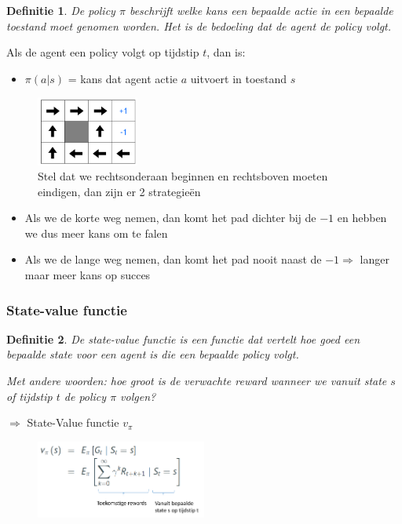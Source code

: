 \documentclass{article}
\newtheorem{theorem}{Definitie}[section]
\begin{document}
\begin{theorem}
    De policy $\pi$ beschrijft welke kans een bepaalde actie in een bepaalde toestand 
    moet genomen worden. Het is de bedoeling dat de agent de policy volgt.
\end{theorem}

Als de agent een policy volgt op tijdstip $t$, dan is:

\begin{itemize}
    \item $\pi(a|s)$ = kans dat agent actie $a$ uitvoert in toestand $s$
\end{itemize}

\begin{figure}[H]
    \centering
    \includegraphics[width=0.3\textwidth]{policy.png}
    \caption{Stel dat we rechtsonderaan beginnen en rechtsboven moeten eindigen, dan zijn er 2 strategieën}
\end{figure}

\begin{itemize}
    \item Als we de korte weg nemen, dan komt het pad dichter bij de $-1$ en hebben we dus meer kans om te falen
    \item Als we de lange weg nemen, dan komt het pad nooit naast de $-1 \Rightarrow$ langer maar meer kans op succes
\end{itemize}

\subsubsection{State-value functie}

\begin{theorem}
    De state-value functie is een functie dat vertelt hoe goed een bepaalde state
    voor een agent is die een bepaalde policy volgt.

    Met andere woorden: hoe groot is de verwachte reward wanneer we vanuit state $s$
    of tijdstip $t$ de policy $\pi$ volgen?
\end{theorem}

$\Rightarrow$ State-Value functie $v_{\pi}$


\begin{figure}[H]
    \centering
    \includegraphics[width=0.5\textwidth]{state-value-function.png}
\end{figure}
\end{document}
